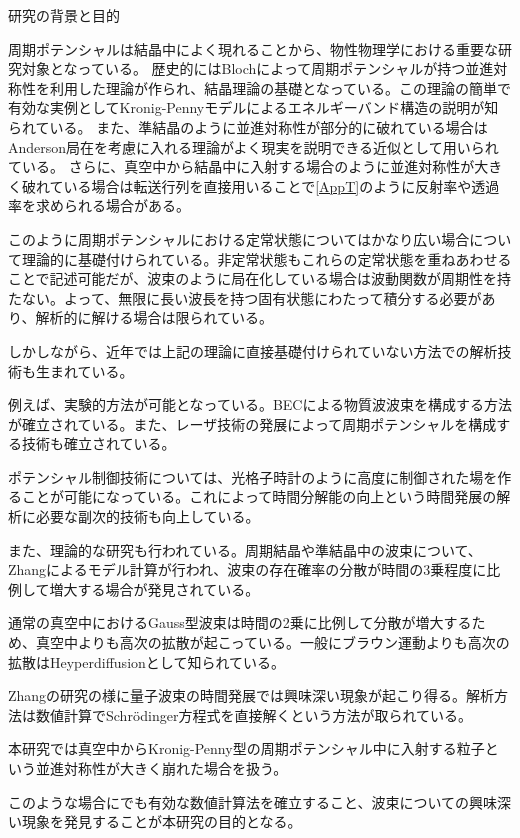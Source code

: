 \documentclass[a4paper, lualatex]{bxjsarticle}
\begin{document}
\begin{section}{研究の背景と目的}
    \par 周期ポテンシャルは結晶中によく現れる\cite{Kittel}ことから、物性物理学における重要な研究対象となっている。 歴史的にはBloch\cite{Bloch}によって周期ポテンシャルが持つ並進対称性を利用した理論が作られ、結晶理論の基礎となっている。この理論の簡単で有効な実例としてKronig-Pennyモデル\cite{KP}によるエネルギーバンド構造の説明が知られている。 また、準結晶のように並進対称性が部分的に破れている場合はAnderson局在\cite{Nagaoka}を考慮に入れる理論がよく現実を説明できる近似として用いられている。 さらに、真空中から結晶中に入射する場合のように並進対称性が大きく破れている場合は転送行列を直接用いることで\ref{AppT}のように反射率や透過率を求められる場合がある。
    \par このように周期ポテンシャルにおける定常状態についてはかなり広い場合について理論的に基礎付けられている。非定常状態もこれらの定常状態を重ねあわせることで記述可能\cite{Koide}だが、波束のように局在化している場合は波動関数が周期性を持たない。よって、無限に長い波長を持つ固有状態にわたって積分する必要があり、解析的に解ける場合は限られている。
    \par しかしながら、近年では上記の理論に直接基礎付けられていない方法での解析技術も生まれている。
    \par 例えば、実験的方法が可能となっている。BECによる物質波波束を構成する方法\cite{Anker}が確立されている。また、レーザ技術の発展によって周期ポテンシャルを構成する技術\cite{Anker}も確立されている。
    \par ポテンシャル制御技術については、光格子時計のように高度に制御された場を作ることが可能になっている。これによって時間分解能の向上\cite{Katori}という時間発展の解析に必要な副次的技術も向上している。
    \par また、理論的な研究も行われている。周期結晶や準結晶中の波束について、Zhangによるモデル計算\cite{Zhang}が行われ、波束の存在確率の分散が時間の3乗程度に比例して増大する場合が発見されている。
    \par 通常の真空中におけるGauss型波束は時間の2乗に比例して分散が増大する\cite{Koide}ため、真空中よりも高次の拡散\cite{Huf}が起こっている。一般にブラウン運動よりも高次の拡散はHeyperdiffusionとして知られている。
    \par Zhangの研究の様に量子波束の時間発展では興味深い現象が起こり得る。解析方法は数値計算でSchrödinger方程式を直接解くという方法が取られている\cite{Moyer,Maeda, Hosaka,Goto, Futohashi}。
    \par 本研究では真空中からKronig-Penny型の周期ポテンシャル中に入射する粒子という並進対称性が大きく崩れた場合を扱う。
    \par このような場合にでも有効な数値計算法を確立すること、波束についての興味深い現象を発見することが本研究の目的となる。
\end{section}
\end{document}
